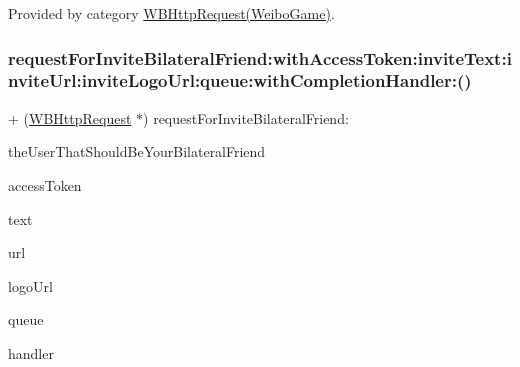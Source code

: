 Provided by category \mbox{\hyperlink{category_w_b_http_request_07_weibo_game_08_aebf781874099f199819a90a1f83f06d5}{W\+B\+Http\+Request(\+Weibo\+Game)}}.

\mbox{\label{interface_w_b_http_request_a82d133ab6df8bbd0b61a6bbdd56fa499}} 
\subsubsection{\texorpdfstring{request\+For\+Invite\+Bilateral\+Friend\+:with\+Access\+Token\+:invite\+Text\+:invite\+Url\+:invite\+Logo\+Url\+:queue\+:with\+Completion\+Handler\+:()}{requestForInviteBilateralFriend:withAccessToken:inviteText:inviteUrl:inviteLogoUrl:queue:withCompletionHandler:()}\hspace{0.1cm}{\footnotesize\ttfamily [1/3]}}
{\footnotesize\ttfamily + (\mbox{\hyperlink{interface_w_b_http_request}{W\+B\+Http\+Request}} $\ast$) request\+For\+Invite\+Bilateral\+Friend\+: \begin{DoxyParamCaption}\item[{(N\+S\+String $\ast$)}]{the\+User\+That\+Should\+Be\+Your\+Bilateral\+Friend }\item[{withAccessToken:(N\+S\+String $\ast$)}]{access\+Token }\item[{inviteText:(N\+S\+String $\ast$)}]{text }\item[{inviteUrl:(N\+S\+String $\ast$)}]{url }\item[{inviteLogoUrl:(N\+S\+String $\ast$)}]{logo\+Url }\item[{queue:(N\+S\+Operation\+Queue $\ast$)}]{queue }\item[{withCompletionHandler:(W\+B\+Request\+Handler)}]{handler }\end{DoxyParamCaption}}

